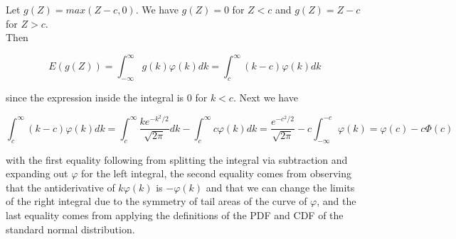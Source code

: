 Let \(g(Z) = max(Z-c, 0)\). We have \(g(Z) = 0\) for \(Z < c\) and \(g(Z) = Z-c\) for \(Z>c\).\\

Then 

\[E(g(Z)) = \int_{-\infty}^{\infty}g(k)\varphi(k)dk = \int_{c}^{\infty}(k-c)\varphi(k)dk\]

since the expression inside the integral is 0 for \(k<c\). Next we have

\[\int_{c}^{\infty}(k-c)\varphi(k)dk = \int_{c}^{\infty}\frac{ke^{-k^{2}/2}}{\sqrt{2\pi}}dk  - \int_{c}^{\infty}c\varphi(k)dk = \frac{e^{-c^{2}/2}}{\sqrt{2\pi}} - c\int_{-\infty}^{-c}\varphi(k) = \varphi(c) - c\Phi(c)\]

with the first equality following from splitting the integral via subtraction and expanding out \(\varphi\) for the left integral, the second equality comes from observing that the antiderivative of \(k\varphi(k)\) is \(-\varphi(k)\) and that we can change the limits of the right integral due to the symmetry of tail areas of the curve of \(\varphi\), and the last equality comes from applying the definitions of the PDF and CDF of the standard normal distribution.
